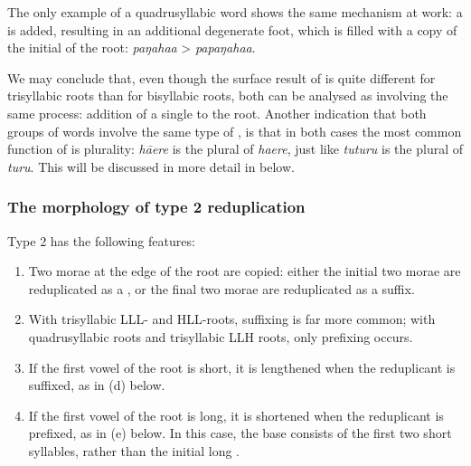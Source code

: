 The only example of a quadrusyllabic word shows the same mechanism at work: a  is added, resulting in an additional degenerate foot, which is filled with a copy of the initial  of the root: \textit{paŋaha{\ꞌ}a} > \textit{papaŋaha{\ꞌ}a}.

We may conclude that, even though the surface result of  is quite different for trisyllabic roots than for bisyllabic roots, both can be analysed as involving the same process: addition of a single  to the root. Another indication that both groups of words involve the same type of , is that in both cases the most common function of  is plurality: \textit{hā{\ꞌ}ere} is the plural of \textit{ha{\ꞌ}ere}, just like \textit{tuturu} is the plural of \textit{turu}. This will be discussed in more detail in  below.

\subsubsection[The morphology of type 2 \isi{reduplication}]{The morphology of type 2 reduplication}\label{sec:2.6.1.2}
Type 2  has the following features:

\begin{enumerate}
\item 
Two morae at the edge of the root are copied: either the initial two morae are reduplicated as a , or the final two morae are reduplicated as a suffix. 

\item 
With trisyllabic LLL- and HLL-roots, suffixing is far more common; with quadrusyllabic roots and trisyllabic LLH roots, only prefixing occurs.

\item 
If the first vowel of the root is short, it is lengthened when the reduplicant is suffixed, as in (d) below.

\item 
If the first vowel of the root is long, it is shortened when the reduplicant is prefixed, as in (e) below. In this case, the  base consists of the first two short syllables, rather than the initial long .

\end{enumerate}

